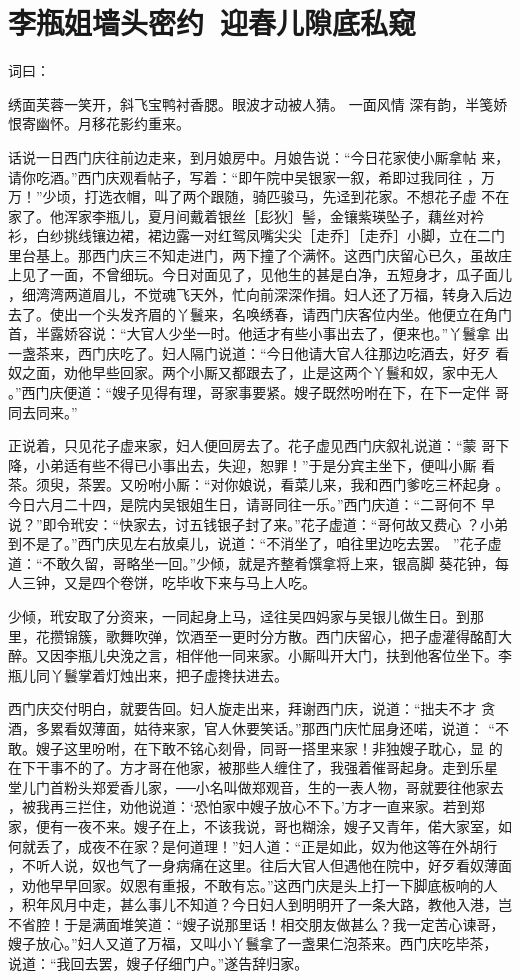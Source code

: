 \chapter{李瓶姐墙头密约~迎春儿隙底私窥}

词曰：

绣面芙蓉一笑开，斜飞宝鸭衬香腮。眼波才动被人猜。  一面风情
深有韵，半笺娇恨寄幽怀。月移花影约重来。

话说一日西门庆往前边走来，到月娘房中。月娘告说：“今日花家使小厮拿帖
来，请你吃酒。”西门庆观看帖子，写着：“即午院中吴银家一叙，希即过我同往
，万万！”少顷，打选衣帽，叫了两个跟随，骑匹骏马，先迳到花家。不想花子虚
不在家了。他浑家李瓶儿，夏月间戴着银丝［髟狄］髻，金镶紫瑛坠子，藕丝对衿
衫，白纱挑线镶边裙，裙边露一对红鸳凤嘴尖尖［走乔］［走乔］小脚，立在二门
里台基上。那西门庆三不知走进门，两下撞了个满怀。这西门庆留心已久，虽故庄
上见了一面，不曾细玩。今日对面见了，见他生的甚是白净，五短身才，瓜子面儿
，细湾湾两道眉儿，不觉魂飞天外，忙向前深深作揖。妇人还了万福，转身入后边
去了。使出一个头发齐眉的丫鬟来，名唤绣春，请西门庆客位内坐。他便立在角门
首，半露娇容说：“大官人少坐一时。他适才有些小事出去了，便来也。”丫鬟拿
出一盏茶来，西门庆吃了。妇人隔门说道：“今日他请大官人往那边吃酒去，好歹
看奴之面，劝他早些回家。两个小厮又都跟去了，止是这两个丫鬟和奴，家中无人
。”西门庆便道：“嫂子见得有理，哥家事要紧。嫂子既然吩咐在下，在下一定伴
哥同去同来。”

正说着，只见花子虚来家，妇人便回房去了。花子虚见西门庆叙礼说道：“蒙
哥下降，小弟适有些不得已小事出去，失迎，恕罪！”于是分宾主坐下，便叫小厮
看茶。须臾，茶罢。又吩咐小厮：“对你娘说，看菜儿来，我和西门爹吃三杯起身
。今日六月二十四，是院内吴银姐生日，请哥同往一乐。”西门庆道：“二哥何不
早说？”即令玳安：“快家去，讨五钱银子封了来。”花子虚道：“哥何故又费心
？小弟到不是了。”西门庆见左右放桌儿，说道：“不消坐了，咱往里边吃去罢。
”花子虚道：“不敢久留，哥略坐一回。”少倾，就是齐整肴馔拿将上来，银高脚
葵花钟，每人三钟，又是四个卷饼，吃毕收下来与马上人吃。

少倾，玳安取了分资来，一同起身上马，迳往吴四妈家与吴银儿做生日。到那
里，花攒锦簇，歌舞吹弹，饮酒至一更时分方散。西门庆留心，把子虚灌得酩酊大
醉。又因李瓶儿央浼之言，相伴他一同来家。小厮叫开大门，扶到他客位坐下。李
瓶儿同丫鬟掌着灯烛出来，把子虚搀扶进去。

西门庆交付明白，就要告回。妇人旋走出来，拜谢西门庆，说道：“拙夫不才
贪酒，多累看奴薄面，姑待来家，官人休要笑话。”那西门庆忙屈身还喏，说道：
“不敢。嫂子这里吩咐，在下敢不铭心刻骨，同哥一搭里来家！非独嫂子耽心，显
的在下干事不的了。方才哥在他家，被那些人缠住了，我强着催哥起身。走到乐星
堂儿门首粉头郑爱香儿家，──小名叫做郑观音，生的一表人物，哥就要往他家去
，被我再三拦住，劝他说道：‘恐怕家中嫂子放心不下。’方才一直来家。若到郑
家，便有一夜不来。嫂子在上，不该我说，哥也糊涂，嫂子又青年，偌大家室，如
何就丢了，成夜不在家？是何道理！”妇人道：“正是如此，奴为他这等在外胡行
，不听人说，奴也气了一身病痛在这里。往后大官人但遇他在院中，好歹看奴薄面
，劝他早早回家。奴恩有重报，不敢有忘。”这西门庆是头上打一下脚底板响的人
，积年风月中走，甚么事儿不知道？今日妇人到明明开了一条大路，教他入港，岂
不省腔！于是满面堆笑道：“嫂子说那里话！相交朋友做甚么？我一定苦心谏哥，
嫂子放心。”妇人又道了万福，又叫小丫鬟拿了一盏果仁泡茶来。西门庆吃毕茶，
说道：“我回去罢，嫂子仔细门户。”遂告辞归家。

